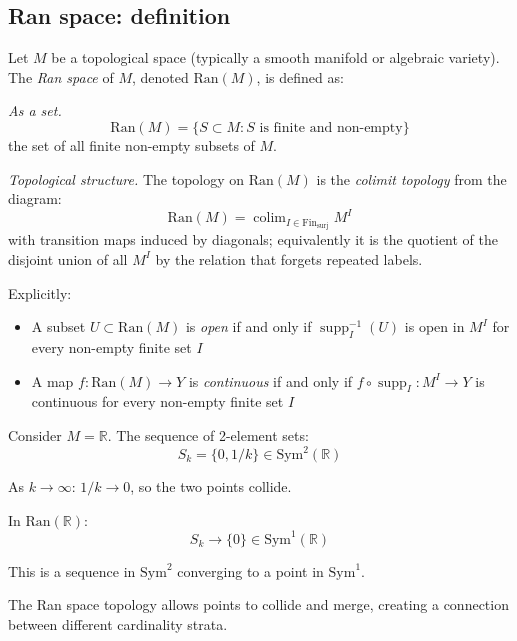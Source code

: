 \subsection{Ran space: definition}

\begin{definition}
\label{def:ran-space-complete}
Let $M$ be a topological space (typically a smooth manifold or algebraic variety).
The \emph{Ran space} of $M$, denoted $\text{Ran}(M)$, is defined as:

\emph{As a set.}
\[\text{Ran}(M) = \{S \subset M : S \text{ is finite and non-empty}\}\]
the set of all finite non-empty subsets of $M$.

\emph{Topological structure.} The topology on $\text{Ran}(M)$ is the \emph{colimit
topology} from the diagram:
\[
\text{Ran}(M)
=
\mathop{\mathrm{colim}}_{I\in\mathrm{Fin}_{\mathrm{surj}}}
M^I
\]
with transition maps induced by diagonals; equivalently it is the
quotient of the disjoint union of all $M^I$ by the relation that forgets
repeated labels.

Explicitly:
\begin{itemize}
\item A subset $U \subset \text{Ran}(M)$ is \emph{open} if and only if
 $\operatorname{supp}_I^{-1}(U)$ is open in $M^I$ for every non-empty
 finite set $I$

\item A map $f: \text{Ran}(M) \to Y$ is \emph{continuous} if and only if
 $f\circ\operatorname{supp}_I\colon M^I\to Y$ is continuous for every
 non-empty finite set $I$
\end{itemize}
\end{definition}

\begin{example}
\label{ex:convergence-ran}
Consider $M = \mathbb{R}$. The sequence of 2-element sets:
\[S_k = \{0, 1/k\} \in \text{Sym}^2(\mathbb{R})\]

As $k \to \infty$: $1/k \to 0$, so the two points collide.

In $\text{Ran}(\mathbb{R})$:
\[S_k \to \{0\} \in \text{Sym}^1(\mathbb{R})\]

This is a sequence in $\text{Sym}^2$ converging to a point in $\text{Sym}^1$.

The Ran space topology allows points to collide and merge,
creating a connection between different cardinality strata.
\end{example}


